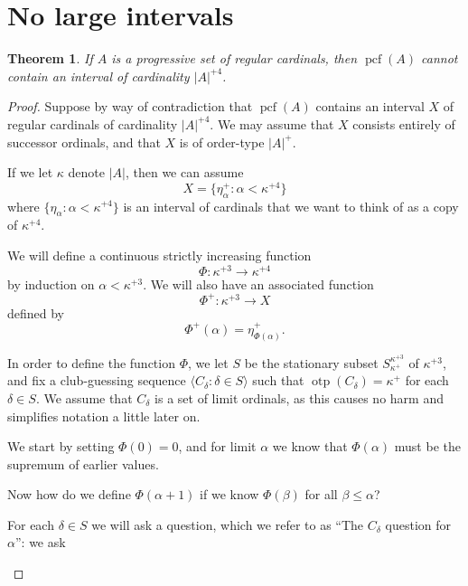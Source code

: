 \documentclass[10pt]{amsart}
\theoremstyle{plain}
\newtheorem{theorem}{Theorem}
\theoremstyle{definition}
\theoremstyle{remark}
\DeclareMathOperator{\otp}{otp}
\DeclareMathOperator{\pcf}{pcf}
\numberwithin{equation}{section}
\begin{document}
\section{No large intervals}


\begin{theorem}
If $A$ is a progressive set of regular cardinals, then $\pcf(A)$ cannot contain an interval of cardinality $|A|^{+4}$.
\end{theorem}
\begin{proof}

Suppose by way of contradiction that $\pcf(A)$ contains an interval $X$ of regular cardinals of cardinality $|A|^{+4}$.
We may assume that $X$ consists entirely of successor ordinals, and that $X$ is of order-type $|A|^+$.

If we let $\kappa$ denote $|A|$, then we can assume
\begin{equation}
X = \{\eta_\alpha^+:\alpha<\kappa^{+4}\}
\end{equation}
where $\{\eta_\alpha:\alpha<\kappa^{+4}\}$ is an interval of cardinals that we want to think of as a copy of $\kappa^{+4}$.

We will define a continuous strictly increasing function
\begin{equation}
  \Phi:\kappa^{+3}\rightarrow \kappa^{+4}
\end{equation}
by induction on $\alpha<\kappa^{+3}$.   We will also have an associated function
\begin{equation}
\Phi^+:\kappa^{+3}\rightarrow X
\end{equation}
defined by
\begin{equation}
\Phi^+(\alpha) = \eta^+_{\Phi(\alpha)}.
\end{equation}


In order to define the function $\Phi$, we let $S$ be the stationary subset $S^{\kappa^{+3}}_{\kappa^+}$ of $\kappa^{+3}$, and fix
a club-guessing sequence $\langle C_\delta:\delta\in S\rangle$ such that $\otp(C_\delta)=\kappa^+$ for each $\delta\in S$.  We  assume that
$C_\delta$ is a set of limit ordinals, as this causes no harm and simplifies notation a little later on.

We start by setting $\Phi(0)=0$, and for limit $\alpha$ we know that $\Phi(\alpha)$ must be the supremum of earlier values.

Now how do we define $\Phi(\alpha+1)$ if we know $\Phi(\beta)$ for all $\beta\leq\alpha$?

For each $\delta\in S$ we will ask a question, which we refer to as ``The $C_\delta$ question for $\alpha$'': we ask
\begin{center}
\fbox{Is $\max\pcf\left(\Phi^+[C_\delta\cap\alpha]\right)\in X$?}
\end{center}


\end{proof}
\end{document}
